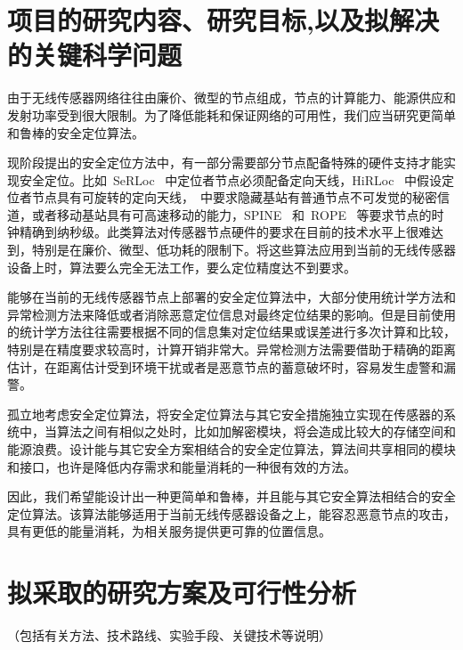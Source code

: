 \documentclass[a4paper,10pt]{article}
\begin{document}
\section{项目的研究内容、研究目标,以及拟解决的关键科学问题} 

由于无线传感器网络往往由廉价、微型的节点组成，节点的计算能力、能源供应和发射功率受到很大限制。为了降低能耗和保证网络的可用性，我们应当研究更简单和鲁棒的安全定位算法。

现阶段提出的安全定位方法中，有一部分需要部分节点配备特殊的硬件支持才能实现安全定位。比如~SeRLoc \cite{Lazos2005}~中定位者节点必须配备定向天线，HiRLoc \cite{Lazos2005a}~中假设定位者节点具有可旋转的定向天线，\cite{Capkun2006a, Capkun2008}~中要求隐藏基站有普通节点不可发觉的秘密信道，或者移动基站具有可高速移动的能力，SPINE \cite{Capkun2006}~和~ROPE \cite{Lazos2006}~等要求节点的时钟精确到纳秒级。此类算法对传感器节点硬件的要求在目前的技术水平上很难达到，特别是在廉价、微型、低功耗的限制下。将这些算法应用到当前的无线传感器设备上时，算法要么完全无法工作，要么定位精度达不到要求。

能够在当前的无线传感器节点上部署的安全定位算法中，大部分使用统计学方法和异常检测方法来降低或者消除恶意定位信息对最终定位结果的影响。但是目前使用的统计学方法往往需要根据不同的信息集对定位结果或误差进行多次计算和比较，特别是在精度要求较高时，计算开销非常大。异常检测方法需要借助于精确的距离估计，在距离估计受到环境干扰或者是恶意节点的蓄意破坏时，容易发生虚警和漏警。

孤立地考虑安全定位算法，将安全定位算法与其它安全措施独立实现在传感器的系统中，当算法之间有相似之处时，比如加解密模块，将会造成比较大的存储空间和能源浪费。设计能与其它安全方案相结合的安全定位算法，算法间共享相同的模块和接口，也许是降低内存需求和能量消耗的一种很有效的方法。

因此，我们希望能设计出一种更简单和鲁棒，并且能与其它安全算法相结合的安全定位算法。该算法能够适用于当前无线传感器设备之上，能容忍恶意节点的攻击，具有更低的能量消耗，为相关服务提供更可靠的位置信息。

\section{拟采取的研究方案及可行性分析} 

（包括有关方法、技术路线、实验手段、关键技术等说明）
\end{document}
